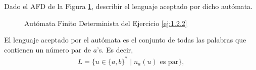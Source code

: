 \begin{ejercicio} \label{ej:1.2.2}
    Dado el AFD de la Figura \ref{fig:ej:1.2.2}, describir el lenguaje aceptado por dicho autómata.
    \begin{figure}
        \centering
        \caption{Autómata Finito Determinista del Ejercicio \ref{ej:1.2.2}}
        \label{fig:ej:1.2.2}
    \end{figure}

    El lenguaje aceptado por el autómata es el conjunto de todas las palabras que contienen
    un número par de $a$'s. Es decir,
    \begin{align*}
        L = \{u \in \{a, b\}^* \mid n_a(u) \text{ es par}\},
    \end{align*}
\end{ejercicio}

